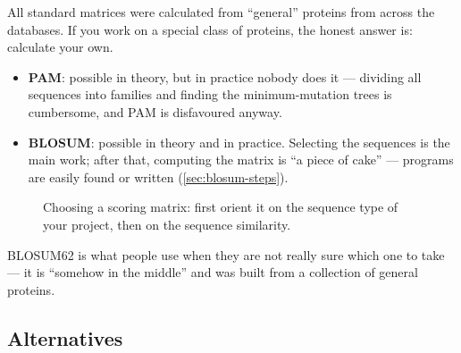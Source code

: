 \documentclass[11pt, oneside]{book}
\let\originalsubsection\subsection
\renewcommand{\subsection}{\Needspace{6\baselineskip}\originalsubsection}
\begin{document}
All standard matrices were calculated from ``general'' proteins from across
the databases. If you work on a special class of proteins, the honest answer is:
calculate your own.
\begin{itemize}
  \item \textbf{PAM}: possible in theory, but in practice nobody does it ---
    dividing all sequences into families and finding the minimum-mutation
    trees is cumbersome, and PAM is disfavoured anyway.
  \item \textbf{BLOSUM}: possible in theory and in practice. Selecting the
    sequences is the main work; after that, computing the matrix is ``a piece of
    cake'' --- programs are easily found or written (\cref{sec:blosum-steps}).
\end{itemize}

\begin{figure}[htbp]
\centering
{}
\caption{Choosing a scoring matrix: first orient it on the sequence type of
your project, then on the sequence similarity.}
\label{fig:choose-matrix}
\end{figure}

BLOSUM62 is what people use when they are not really sure which one to take ---
it is ``somehow in the middle'' and was built from a collection of general
proteins.

\subsection{Alternatives}
\end{document}
